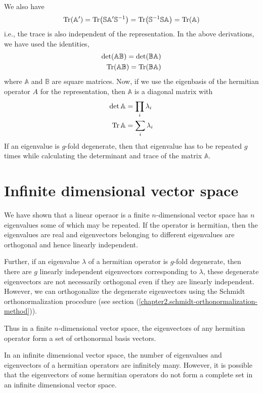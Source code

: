 	We also have
	\begin{equation}
		\Tr (\mathbb{A}^\prime) = \Tr (\mathbb{S}\mathbb{A}^\prime\mathbb{S}^{-1})=\Tr(\mathbb{S}^{-1}\mathbb{S} \mathbb{A}) = \Tr (\mathbb{A})
	\end{equation}
	i.e., the trace is also independent of the representation. In the above derivations, we have used the identities,
	\begin{eqnarray}
		\det( \mathbb{A}\mathbb{B}) = \det(\mathbb{B}\mathbb{A}) \\
		\Tr( \mathbb{A}\mathbb{B}) = \Tr(\mathbb{B}\mathbb{A})
	\end{eqnarray}
	where $\mathbb{A}$ and $\mathbb{B}$ are square matrices. Now, if we use the eigenbasis of the hermitian operator $A$ for the representation, then $\mathbb{A}$ is a diagonal matrix with
	\begin{eqnarray}
		\det \mathbb{A} &= \prod_i \lambda_i \\
		\Tr \mathbb{A} &= \sum_i \lambda_i 
	\end{eqnarray}
	If an eigenvalue is $g$-fold degenerate, then that eigenvalue has to be repeated $g$ times while calculating the determinant and trace of the matrix $\mathbb{A}$.
	
	
	
	\section{Infinite dimensional vector space}
	We have shown that a linear operaor is a finite $n$-dimensional vector space has $n$ eigenvalues some of which may be repeated. If the operator is hermitian, then the eigenvalues are real and eigenvectors belonging to different eigenvalues are orthogonal and hence linearly independent.
	
	Further, if an eigenvalue $\lambda$ of a hermitian operator is $g$-fold degenerate, then there are $g$ linearly independent eigenvectors corresponding to $\lambda$, these degenerate eigenvectors are not necessarily orthogonal even if they are linearly independent. However, we can orthogonalize the degenerate eigenvectors using the Schmidt orthonormalization procedure (see section (\ref{chapter2.schmidt-orthonormalization-method})). 
	
	
	Thus in a finite $n$-dimensional vector space, the eigenvectors of any hermitian operator form a set of orthonormal basis vectors.
	
	
	In an infinite dimensional vector space, the number of eigenvalues and eigenvectors of a hermitian operators are infinitely many. However, it is possible that the eigenvectors of some hermitian operators do not form a complete set in an infinite dimensional vector space.

